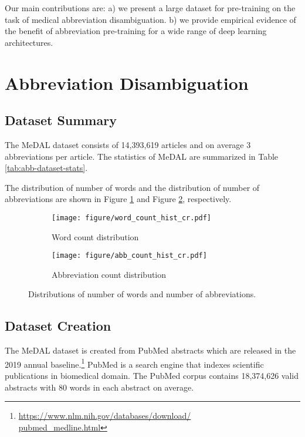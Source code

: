 \documentclass[11pt,a4paper]{article}
\begin{document}
Our main contributions are: a) we present a large dataset for pre-training on the task of medical abbreviation disambiguation. b) we provide empirical evidence of the benefit of abbreviation pre-training for a wide range of deep learning architectures.

\section{Abbreviation Disambiguation}

\subsection{Dataset Summary}\label{ss:dataset}



The MeDAL dataset consists of 14,393,619 articles and on average 3 abbreviations per article. The statistics of MeDAL are summarized in Table \ref{tab:abb-dataset-stats}.

The distribution of number of words and the distribution of number of abbreviations are shown in Figure \ref{sfig:word_hist} and Figure \ref{sfig:abb_hist}, respectively.

\begin{figure}
    \centering
    \begin{subfigure}[h]{0.4\textwidth}
        \centering
        \texttt{[image: figure/word\_count\_hist\_cr.pdf]}
        \caption{Word count distribution}
\label{sfig:word_hist}
    \end{subfigure}
    \hfill
    \begin{subfigure}[h]{0.4\textwidth}
        \centering
        \texttt{[image: figure/abb\_count\_hist\_cr.pdf]}
        \caption{Abbreviation count distribution}
\label{sfig:abb_hist}
    \end{subfigure}
    \caption{Distributions of number of words and number of abbreviations.}
    \label{fig:data_dists}
\end{figure}

\subsection{Dataset Creation}

The MeDAL dataset is created from PubMed abstracts which are released in the 2019 annual baseline.\footnote{\href{https://www.nlm.nih.gov/databases/download/pubmed_medline.html}{https://www.nlm.nih.gov/databases/download/\\ pubmed\_medline.html}} PubMed is a search engine that indexes scientific publications in biomedical domain. The PubMed corpus contains 18,374,626 valid abstracts with 80 words in each abstract on average. 
\end{document}
